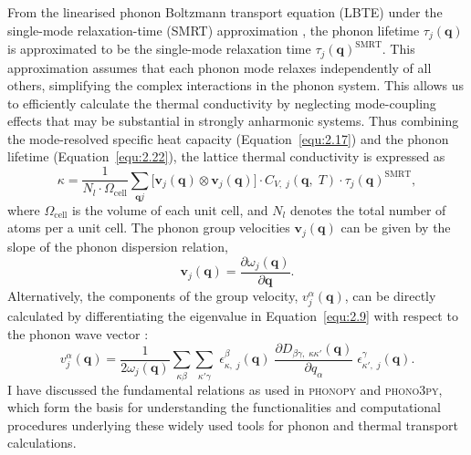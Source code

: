 From the linearised phonon Boltzmann transport equation (LBTE) under the single-mode relaxation-time (SMRT) approximation \cite{srivastava_1990}, the phonon lifetime \( \tau_j(\mathbf{q}) \) is approximated to be the single-mode relaxation time \( \tau_j(\mathbf{q})^{\text{SMRT}} \).
This approximation assumes that each phonon mode relaxes independently of all others, simplifying the complex interactions in the phonon system. This allows us to efficiently calculate the thermal conductivity by neglecting mode-coupling effects that may be substantial in strongly anharmonic systems.
Thus combining the mode-resolved specific heat capacity (Equation~\eqref{equ:2.17}) and the phonon lifetime (Equation~\eqref{equ:2.22}), the lattice thermal conductivity is expressed as
\begin{equation}
\label{equ:2.23}
       \kappa = \frac{1}{N_{l}\cdot \Omega_{\text{cell}}}\sum_{\mathbf{q}j}\Big[\mathbf{v}_{j}(\mathbf{q})\otimes \mathbf{v}_{j}(\mathbf{q})\Big]\cdot C_{V,\;j}(\mathbf{q},\;T)\cdot \tau_{j}(\mathbf{q})^{\text{SMRT}},
\end{equation}
where $\Omega_{\text{cell}}$ is the volume of each unit cell, and $N_{l}$ denotes the total number of atoms per a unit cell.
The phonon group velocities $\mathbf{v}_{j}(\mathbf{q})$ can be given by the slope of the phonon dispersion relation,
\begin{equation}
\label{equ:2.24}
   \mathbf{v}_{j}(\mathbf{q})=\frac{\partial \omega_{j}(\mathbf{q})}{\partial \mathbf{q}}.
\end{equation}
Alternatively, the components of the group velocity, $v^{\alpha}_{j}(\mathbf{q})$, can be directly calculated by differentiating the eigenvalue in Equation~\eqref{equ:2.9} with respect to the phonon wave vector \cite{Togo2015-qf}:
\begin{equation}
\label{equ:2.25}
        v^{\alpha}_{j}(\mathbf{q}) = \frac{1}{2\omega_{j}(\mathbf{q})}\sum_{\kappa\beta}\sum_{\kappa'\gamma}\;\epsilon^{\beta}_{\kappa,\;j}(\mathbf{q})
        \;\frac{\partial D_{\beta\gamma,\;\kappa\kappa'}(\mathbf{q})}{\partial q_{\alpha}}\;\epsilon^{\gamma}_{\kappa',\;j}(\mathbf{q}).
\end{equation}
I have discussed the fundamental relations as used in \textsc{phonopy} and \textsc{phono3py}, which form the basis for understanding the functionalities and computational procedures underlying these widely used tools for phonon and thermal transport calculations. 

